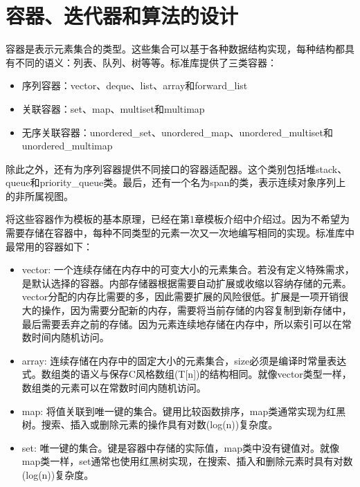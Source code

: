 \section{容器、迭代器和算法的设计}
容器是表示元素集合的类型。这些集合可以基于各种数据结构实现，每种结构都具有不同的语义：列表、队列、树等等。标准库提供了三类容器：

\begin{itemize}
  \item
        序列容器：vector、deque、list、array和forward\_list

  \item
        关联容器：set、map、multiset和multimap

  \item
        无序关联容器：unordered\_set、unordered\_map、unordered\_multiset和unordered\_multimap
\end{itemize}

除此之外，还有为序列容器提供不同接口的容器适配器。这个类别包括堆stack、queue和priority\_queue类。最后，还有一个名为span的类，表示连续对象序列上的非所属视图。

将这些容器作为模板的基本原理，已经在第1章模板介绍中介绍过。因为不希望为需要存储在容器中，每种不同类型的元素一次又一次地编写相同的实现。标准库中最常用的容器如下：

\begin{itemize}
  \item
        vector: 一个连续存储在内存中的可变大小的元素集合。若没有定义特殊需求，是默认选择的容器。内部存储器根据需要自动扩展或收缩以容纳存储的元素。vector分配的内存比需要的多，因此需要扩展的风险很低。扩展是一项开销很大的操作，因为需要分配新的内存，需要将当前存储的内容复制到新存储中，最后需要丢弃之前的存储。因为元素连续地存储在内存中，所以索引可以在常数时间内随机访问。

  \item
        array: 连续存储在内存中的固定大小的元素集合，size必须是编译时常量表达式。数组类的语义与保存C风格数组(T[n])的结构相同。就像vector类型一样，数组类的元素可以在常数时间内随机访问。

  \item
        map: 将值关联到唯一键的集合。键用比较函数排序，map类通常实现为红黑树。搜索、插入或删除元素的操作具有对数(log(n))复杂度。

  \item
        set: 唯一键的集合。键是容器中存储的实际值，map类中没有键值对。就像map类一样，set通常也使用红黑树实现，在搜索、插入和删除元素时具有对数(log(n))复杂度。
\end{itemize}

